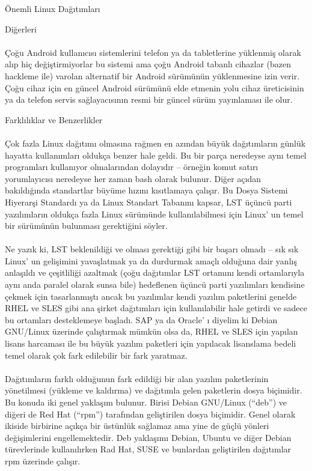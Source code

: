 \documentclass[10pt,a5paper]{book}
\begin{document}
\begin{section}{Önemli Linux Dağıtımları}
\begin{subsection}{Diğerleri}
\paragraph{}{Çoğu Android kullanıcısı sistemlerini telefon ya da tabletlerine yüklenmiş olarak alıp hiç değiştirmiyorlar bu sistemi ama çoğu Android tabanlı cihazlar (bazen hackleme ile) varolan alternatif bir Android sürümünün yüklenmesine izin verir. Çoğu cihaz için en güncel Android sürümünü elde etmenin yolu cihaz üreticisinin ya da telefon servis sağlayacısının resmi bir güncel sürüm yayınlaması ile olur.}
\end{subsection}
\begin{subsection}{Farklılıklar ve Benzerlikler}
\paragraph{}{Çok fazla Linux dağıtımı olmasına rağmen en azından büyük dağıtımların günlük hayatta kullanımları oldukça benzer hale geldi. Bu bir parça neredeyse aynı temel programları kullanıyor olmalarından dolayıdır – örneğin komut satırı yorumlayıcısı neredeyse her zaman bash olarak bulunur. Diğer açıdan bakıldığında standartlar büyüme hızını kısıtlamaya çalışır. Bu Dosya Sistemi Hiyerarşi Standardı ya da Linux Standart Tabanını kapsar, LST üçüncü parti yazılımların oldukça fazla Linux sürümünde kullanılabilmesi için Linux' un temel bir sürümünün bulunması gerektiğini söyler.}
\paragraph{}{Ne yazık ki, LST beklenildiği ve olması gerektiği gibi bir başarı olmadı – sık sık Linux' un gelişimini yavaşlatmak ya da durdurmak amaçlı olduğuna dair yanlış anlaşıldı ve çeşitliliği azaltmak (çoğu dağıtımlar LST ortamını kendi ortamlarıyla aynı anda paralel olarak sunsa bile) hedeflenen üçüncü parti yazılımları kendisine çekmek için tasarlanmıştı ancak bu yazılımlar kendi yazılım paketlerini genelde RHEL ve SLES gibi ana şirket dağıtımları için kullanılabilir hale getirdi ve sadece bu ortamları desteklemeye başladı. SAP ya da Oracle' ı diyelim ki Debian GNU/Linux üzerinde çalıştırmak mümkün olsa da, RHEL ve SLES için yapılan lisans harcaması ile bu büyük yazılım paketleri için yapılacak lisanslama bedeli temel olarak çok fark edilebilir bir fark yaratmaz.}
\paragraph{}{Dağıtımların farklı olduğunun fark edildiği bir alan yazılım paketlerinin yönetilmesi (yükleme ve kaldırma) ve dağıtımla gelen paketlerin dosya biçimidir. Bu konuda iki genel yaklaşım bulunur. Birisi Debian GNU/Linux (“deb”) ve diğeri de Red Hat (“rpm”) tarafından geliştirilen dosya biçimidir. Genel olarak ikiside birbirine açıkça bir üstünlük sağlamaz ama yine de güçlü yönleri değişimlerini engellemektedir. Deb yaklaşımı Debian, Ubuntu ve diğer Debian türevlerinde kullanılırken Rad Hat, SUSE ve bunlardan geliştirilen dağıtımlar rpm üzerinde çalışır.}

\end{subsection}
\end{section}
\end{document}
